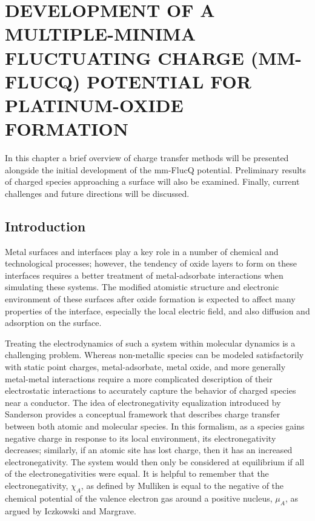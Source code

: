 
\chapter{DEVELOPMENT OF A MULTIPLE-MINIMA FLUCTUATING CHARGE (MM-FLUCQ) POTENTIAL FOR PLATINUM-OXIDE FORMATION}
\label{chap:mmFlucQ}


In this chapter a brief overview of charge transfer methods will be presented
alongside the initial development of the mm-FlucQ potential.  Preliminary
results of charged species approaching a  surface will also be
examined. Finally, current challenges and future directions will be discussed.


\section{Introduction}
Metal surfaces and interfaces play a key role in a number of chemical and
technological processes; however, the tendency of oxide layers to form on these
interfaces requires a better treatment of metal-adsorbate interactions when
simulating these systems\citep{Streitz:1994mw, Duin:2010dk, Devine:2011bk,
Fantauzzi:2014pb}.  The modified atomistic structure and electronic environment
of these surfaces after oxide formation is expected to affect many properties
of the interface, especially the local electric field, and also diffusion and
adsorption on the surface.\citep{Streitz:1994mw, Getman:2008sp,
Bray:2011hq,Small:2012dw}

Treating the electrodynamics of such a system within molecular dynamics is a
challenging problem. Whereas non-metallic species can be modeled satisfactorily
with static point charges, metal-adsorbate, metal oxide, and more generally
metal-metal interactions require a more complicated description of their
electrostatic interactions to accurately capture the behavior of charged
species near a conductor. The idea of electronegativity equalization introduced
by Sanderson\citep{Sanderson:1951mz} provides a conceptual framework that
describes charge transfer between both atomic and molecular species. In this
formalism, as a species gains negative charge in response to its local
environment, its electronegativity decreases; similarly, if an atomic site has
lost charge, then it has an increased electronegativity. The system would then
only be considered at equilibrium if all of the electronegativities were equal.
It is helpful to remember that the electronegativity, $\chi_A$, as defined by
Mulliken\citep{Mulliken:1934wt} is equal to the negative of the chemical
potential of the valence electron gas around a positive nucleus, $\mu_A$, as
argued by Iczkowski and Margrave\citep{Iczkowski:1961wq}.

